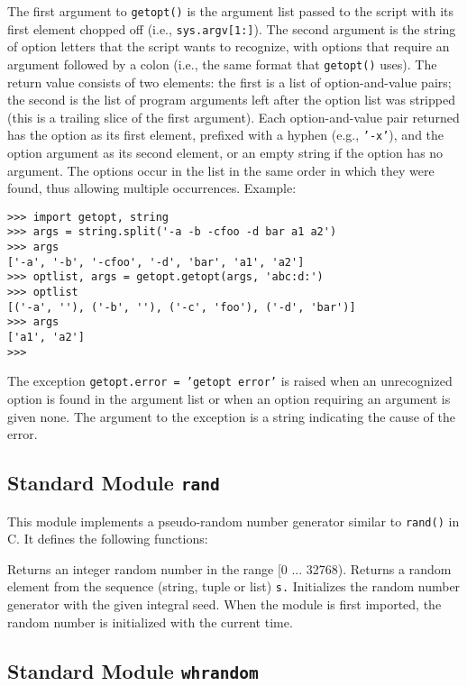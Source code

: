 The first argument to
{\tt getopt()}
is the argument list passed to the script with its first element
chopped off (i.e.,
{\tt sys.argv[1:]}).
The second argument is the string of option letters that the
script wants to recognize, with options that require an argument
followed by a colon (i.e., the same format that {\UNIX}
{\tt getopt()}
uses).
The return value consists of two elements: the first is a list of
option-and-value pairs; the second is the list of program arguments
left after the option list was stripped (this is a trailing slice of the
first argument).
Each option-and-value pair returned has the option as its first element,
prefixed with a hyphen (e.g.,
{\tt '-x'}),
and the option argument as its second element, or an empty string if the
option has no argument.
The options occur in the list in the same order in which they were
found, thus allowing multiple occurrences.
Example:
\bcode\begin{verbatim}
>>> import getopt, string
>>> args = string.split('-a -b -cfoo -d bar a1 a2')
>>> args
['-a', '-b', '-cfoo', '-d', 'bar', 'a1', 'a2']
>>> optlist, args = getopt.getopt(args, 'abc:d:')
>>> optlist
[('-a', ''), ('-b', ''), ('-c', 'foo'), ('-d', 'bar')]
>>> args
['a1', 'a2']
>>>
\end{verbatim}\ecode
The exception
{\tt getopt.error = 'getopt error'}
is raised when an unrecognized option is found in the argument list or
when an option requiring an argument is given none.
The argument to the exception is a string indicating the cause of the
error.

\subsection{Standard Module {\tt rand}}

This module implements a pseudo-random number generator similar to
{\tt rand()}
in C.
It defines the following functions:
\begin{description}
Returns an integer random number in the range [0 ... 32768).
Returns a random element from the sequence (string, tuple or list)
{\tt s.}
Initializes the random number generator with the given integral seed.
When the module is first imported, the random number is initialized with
the current time.
\end{description}

\subsection{Standard Module {\tt whrandom}}

